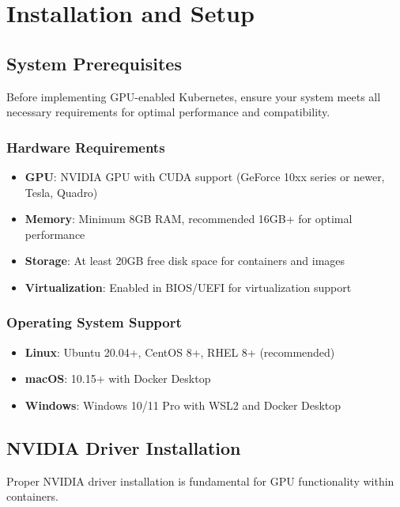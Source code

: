 \documentclass[12pt,a4paper]{report}
\begin{document}
\chapter{Installation and Setup}
\label{chap:installation}

\section{System Prerequisites}
Before implementing GPU-enabled Kubernetes, ensure your system meets all necessary requirements for optimal performance and compatibility.

\subsection{Hardware Requirements}
\begin{itemize}
    \item \textbf{GPU}: NVIDIA GPU with CUDA support (GeForce 10xx series or newer, Tesla, Quadro)
    \item \textbf{Memory}: Minimum 8GB RAM, recommended 16GB+ for optimal performance
    \item \textbf{Storage}: At least 20GB free disk space for containers and images
    \item \textbf{Virtualization}: Enabled in BIOS/UEFI for virtualization support
\end{itemize}

\subsection{Operating System Support}
\begin{itemize}
    \item \textbf{Linux}: Ubuntu 20.04+, CentOS 8+, RHEL 8+ (recommended)
    \item \textbf{macOS}: 10.15+ with Docker Desktop
    \item \textbf{Windows}: Windows 10/11 Pro with WSL2 and Docker Desktop
\end{itemize}

\section{NVIDIA Driver Installation}
Proper NVIDIA driver installation is fundamental for GPU functionality within containers.
\end{document}
